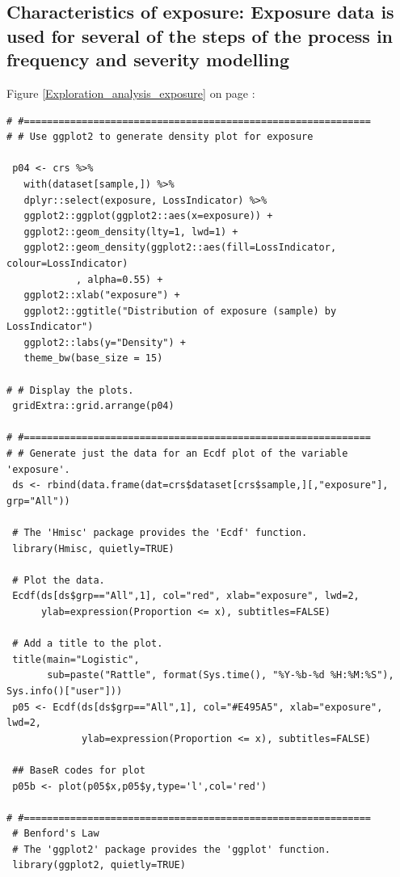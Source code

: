 \documentclass{DissertateUSU}
\begin{document}
\normalsize

\subsection{Characteristics of exposure: Exposure data is used for several of the steps of the process in frequency and severity modelling}
\label{ssec:Characteristics of exposure}

Figure \ref{Exploration_analysis_exposure} on page
\pageref{Exploration_analysis_exposure}:

\small

\begin{verbatim}
# #============================================================
# # Use ggplot2 to generate density plot for exposure

 p04 <- crs %>%
   with(dataset[sample,]) %>%
   dplyr::select(exposure, LossIndicator) %>%
   ggplot2::ggplot(ggplot2::aes(x=exposure)) +
   ggplot2::geom_density(lty=1, lwd=1) +
   ggplot2::geom_density(ggplot2::aes(fill=LossIndicator, colour=LossIndicator)
            , alpha=0.55) +
   ggplot2::xlab("exposure") +
   ggplot2::ggtitle("Distribution of exposure (sample) by LossIndicator") 
   ggplot2::labs(y="Density") + 
   theme_bw(base_size = 15)
 
# # Display the plots.
 gridExtra::grid.arrange(p04)
 
# #============================================================
# # Generate just the data for an Ecdf plot of the variable 'exposure'.
 ds <- rbind(data.frame(dat=crs$dataset[crs$sample,][,"exposure"], grp="All"))
 
 # The 'Hmisc' package provides the 'Ecdf' function.
 library(Hmisc, quietly=TRUE)
 
 # Plot the data.
 Ecdf(ds[ds$grp=="All",1], col="red", xlab="exposure", lwd=2, 
      ylab=expression(Proportion <= x), subtitles=FALSE)
 
 # Add a title to the plot.
 title(main="Logistic",
       sub=paste("Rattle", format(Sys.time(), "%Y-%b-%d %H:%M:%S"), Sys.info()["user"]))
 p05 <- Ecdf(ds[ds$grp=="All",1], col="#E495A5", xlab="exposure", lwd=2,
             ylab=expression(Proportion <= x), subtitles=FALSE)
 
 ## BaseR codes for plot
 p05b <- plot(p05$x,p05$y,type='l',col='red')
 
# #============================================================
 # Benford's Law 
 # The 'ggplot2' package provides the 'ggplot' function.
 library(ggplot2, quietly=TRUE)
 

\end{verbatim}
\end{document}
